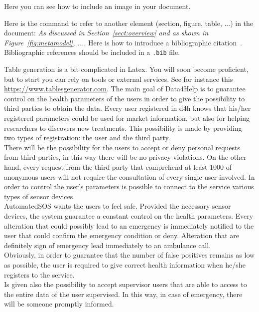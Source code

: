 Here you can see how to include an image in your document.


Here is the command to refer to another element (section, figure, table, ...) in the document: \emph{As discussed in Section~\ref{sect:overview} and as shown in Figure~\ref{fig:metamodel}, ...}. Here is how to introduce a bibliographic citation~\cite{DAM}. Bibliographic references should be included in a \texttt{.bib} file. 

Table generation is a bit complicated in Latex. You will soon become proficient, but to start you can rely on tools or external services. See for instance this \href{https://www.tablesgenerator.com}{https://www.tablesgenerator.com}. 
{}
{}
The main goal of Data4Help is to guarantee control on the health parameters of the users in order to give the possibility to third parties to obtain the data. Every user registered in d4h knows that his/her registered parameters could be used for market information, but also for helping researchers to discovers new treatments. This possibility is made by providing two types of registration: the user and the third party.\\
There will be the possibility for the users to accept or deny personal requests from third parties, in this way there will be no privacy violations. On the other hand, every request from the third party that comprehend at least 1000 of anonymous users will not require the consultation of every single user involved. In order to control the user’s parameters is possible to connect to the service various types of sensor devices.\\


{}
AutomatedSOS wants the users to feel safe. Provided the necessary sensor devices, the system guarantee a constant control on the health parameters. Every alteration that could possibly lead to an emergency is immediately notified to the user that could confirm the emergency condition or deny. Alteration that are definitely sign of emergency lead immediately to an ambulance call.\\
Obviously, in order to guarantee that the number of false positives remains as low as possible, the user is required to give correct health information when he/she registers to the service. \\
Is given also the possibility to accept supervisor users that are able to access to the entire data of the user supervised. In this way, in case of emergency, there will be someone promptly informed.


